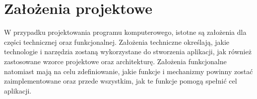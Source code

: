 \chapter{Założenia projektowe}
\label{ch:zalozenia_projektowe}

W przypadku projektowania programu komputerowego, istotne są założenia dla części technicznej oraz funkcjonalnej.
Założenia techniczne określają, jakie technologie i narzędzia zostaną wykorzystane do stworzenia aplikacji,
jak również zastosowane wzorce projektowe oraz architekturę.
Założenia funkcjonalne natomiast mają na celu zdefiniowanie, jakie funkcje i mechanizmy powinny zostać zaimplementowane
oraz przede wszystkim, jak te funkcje pomogą spełnić cel aplikacji.



